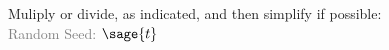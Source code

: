 \documentclass{article}%
\begin{document}

\noindent Muliply or divide, as indicated, and then simplify if possible: \\
\textcolor{gray}{Random Seed: $\sage{t}$}


\begin{multicols}{3}
\begin{enumerate}
\end{enumerate}
\end{multicols}


\vfill
\newpage


\begin{multicols}{3}
\begin{enumerate}
\end{enumerate}
\end{multicols}
\end{document}
